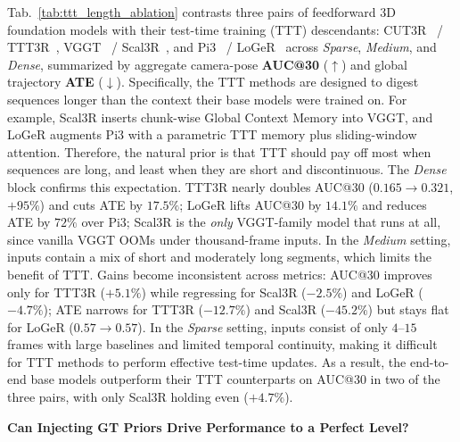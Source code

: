 Tab.~\ref{tab:ttt_length_ablation} contrasts three pairs of feedforward 3D foundation models with their test-time training (TTT) descendants: CUT3R~\citep{wang2025cut3r} / TTT3R~\citep{chen2025ttt3r}, VGGT~\citep{wang2025vggt} / Scal3R~\citep{xie2026scal3r}, and Pi3~\citep{wang2025pi3} / LoGeR~\citep{zhang2026loger} across \emph{Sparse}, \emph{Medium}, and \emph{Dense}, summarized by aggregate camera-pose \textbf{AUC@30} ($\uparrow$) and global trajectory \textbf{ATE} ($\downarrow$).
%
Specifically, the TTT methods are designed to digest sequences longer than the context their base models were trained on.
%
For example, Scal3R inserts chunk-wise Global Context Memory into VGGT, and LoGeR augments Pi3 with a parametric TTT memory plus sliding-window attention.
%
Therefore, the natural prior is that TTT should pay off most when sequences are long, and least when they are short and discontinuous.
%
The \emph{Dense} block confirms this expectation. 
%
TTT3R nearly doubles AUC@30 ($0.165\!\to\!0.321$, $+95\%$) and cuts ATE by $17.5\%$; LoGeR lifts AUC@30 by $14.1\%$ and reduces ATE by $72\%$ over Pi3; Scal3R is the \textit{only} VGGT-family model that runs at all, since vanilla VGGT OOMs under thousand-frame inputs.
%
In the \emph{Medium} setting, inputs contain a mix of short and moderately long segments, which limits the benefit of TTT. 
%
Gains become inconsistent across metrics: AUC@30 improves only for TTT3R ($+5.1\%$) while regressing for Scal3R ($-2.5\%$) and LoGeR ($-4.7\%$); ATE narrows for TTT3R ($-12.7\%$) and Scal3R ($-45.2\%$) but stays flat for LoGeR ($0.57\!\to\!0.57$).
%
In the \emph{Sparse} setting, inputs consist of only $4$--$15$ frames with large baselines and limited temporal continuity, making it difficult for TTT methods to perform effective test-time updates. 
%
As a result, the end-to-end base models outperform their TTT counterparts on AUC@30 in two of the three pairs, with only Scal3R holding even ($+4.7\%$).
%



\noindent\textbf{Can Injecting GT Priors Drive Performance to a Perfect Level?}



